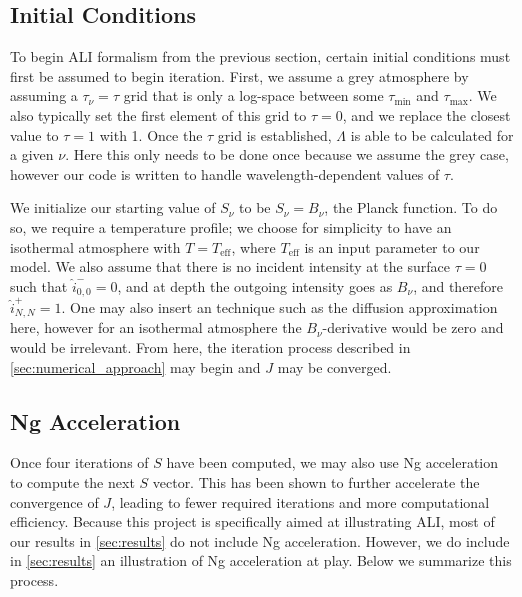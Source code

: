 \documentclass[12pt]{article}
\begin{document}
\subsection{Initial Conditions}


To begin ALI formalism from the previous section, certain initial conditions must first be assumed to begin iteration. First, we assume a grey atmosphere by assuming a $\tau_\nu = \tau$ grid that is only a log-space between some $\tau_\text{min}$ and $\tau_\text{max}$. We also typically set the first element of this grid to $\tau = 0$, and we replace the closest value to $\tau = 1$ with 1. Once the $\tau$ grid is established, $\Lambda$ is able to be calculated for a given $\nu$. Here this only needs to be done once because we assume the grey case, however our code is written to handle wavelength-dependent values of $\tau$.

We initialize our starting value of $S_\nu$ to be $S_\nu = B_\nu$, the Planck function. To do so, we require a temperature profile; we choose for simplicity to have an isothermal atmosphere with $T = T_\text{eff}$, where $T_\text{eff}$ is an input parameter to our model. We also assume that there is no incident intensity at the surface $\tau = 0$ such that $\hat{i}^-_{0, 0} = 0$, and at depth the outgoing intensity goes as $B_\nu$, and therefore $\hat{i}^+_{N, N} = 1$. One may also insert an technique such as the diffusion approximation here, however for an isothermal atmosphere the $B_\nu$-derivative would be zero and would be irrelevant. From here, the iteration process described in \autoref{sec:numerical_approach} may begin and $J$ may be converged.


\subsection{Ng Acceleration}


Once four iterations of $S$ have been computed, we may also use Ng acceleration \citep{ng_1974} to compute the next $S$ vector. This has been shown to further accelerate the convergence of $J$, leading to fewer required iterations and more computational efficiency. Because this project is specifically aimed at illustrating ALI, most of our results in \autoref{sec:results} do not include Ng acceleration. However, we do include in \autoref{sec:results} an illustration of Ng acceleration at play. Below we summarize this process.
\end{document}
